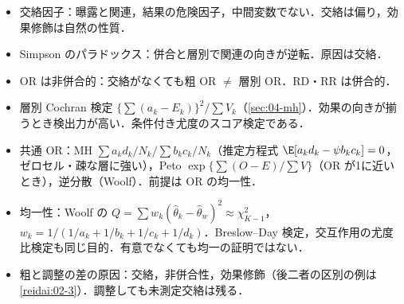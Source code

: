 \begin{summarybox}
\begin{itemize}
\item 交絡因子：曝露と関連，結果の危険因子，中間変数でない．交絡は偏り，効果修飾は自然の性質．
\item Simpson のパラドックス：併合と層別で関連の向きが逆転．原因は交絡．
\item OR は非併合的：交絡がなくても粗 OR $\ne$ 層別 OR．RD・RR は併合的．
\item 層別 Cochran 検定 $\{\sum(a_k-E_k)\}^2/\sum V_k$（\cref{sec:04-mh}）．効果の向きが揃うとき検出力が高い．条件付き尤度のスコア検定である．
\item 共通 OR：MH $\sum a_kd_k/N_k\big/\sum b_kc_k/N_k$（推定方程式 $\E[a_kd_k-\psi b_kc_k]=0$，ゼロセル・疎な層に強い），Peto $\exp\{\sum(O-E)/\sum V\}$（OR が1に近いとき），逆分散（Woolf）．前提は OR の均一性．
\item 均一性：Woolf の $Q=\sum w_k(\hat\theta_k-\hat\theta_w)^2\approx\chi^2_{K-1}$，$w_k=1/(1/a_k+1/b_k+1/c_k+1/d_k)$．Breslow--Day 検定，交互作用の尤度比検定も同じ目的．有意でなくても均一の証明ではない．
\item 粗と調整の差の原因：交絡，非併合性，効果修飾（後二者の区別の例は\cref{reidai:02-3}）．調整しても未測定交絡は残る．
\end{itemize}
\end{summarybox}
